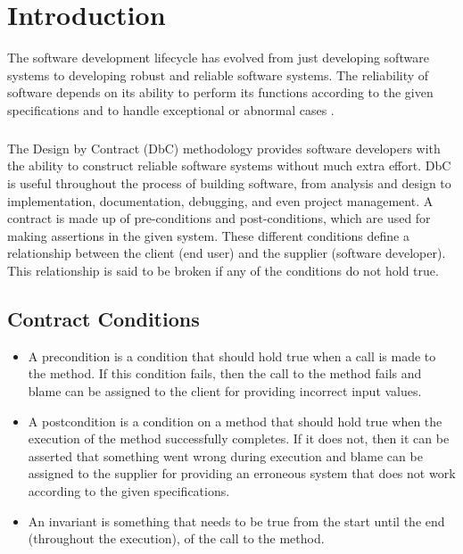 \chapter{Introduction}

The software development lifecycle has evolved from just developing software systems to developing robust and reliable software systems. The reliability of software depends on its ability to perform its functions according to the given specifications and to handle exceptional or abnormal cases \cite{ApplyingDesignByContract}.
\paragraph{}
The Design by Contract (DbC) methodology provides software developers with the ability to construct reliable software systems without much extra effort. DbC is useful throughout the process of building software, from analysis and design to implementation, documentation, debugging, and even project management\cite{DesignByContractByExample}. A contract is made up of pre-conditions and post-conditions, which are used for making assertions in the given system. These different conditions define a relationship between the client (end user) and the supplier (software developer). This relationship is said to be broken if any of the conditions do not hold true.



\section{Contract Conditions}

\begin{itemize}
\item A precondition is a condition that should hold true when a call is made to the method. If this condition fails, then the call to the method fails and blame can be assigned to the client for providing incorrect input values.
\item A postcondition is a condition on a method that should hold true when the execution of the method successfully completes. If it does not, then it can be asserted that something went wrong during execution and blame can be assigned to the supplier for providing an erroneous system that does not work according to the given specifications.
\item An invariant is something that needs to be true from the start until the end (throughout the execution), of the call to the method.
\end{itemize}

